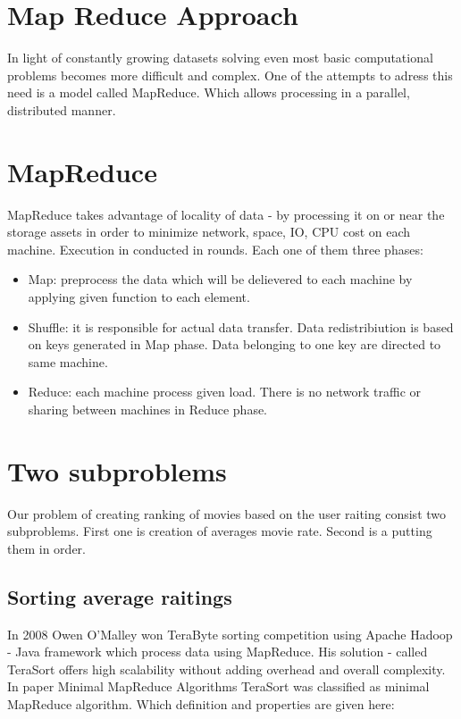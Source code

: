 \section{Map Reduce Approach}
In light of constantly growing datasets solving even 
most basic computational problems becomes more difficult and complex.
One of the attempts to adress this need is a model called MapReduce.
Which allows processing in a parallel, distributed manner.

\section{MapReduce}
MapReduce takes advantage of locality of data - by processing it on 
or near the storage assets in order to minimize network, space, IO,
CPU cost on each machine.
Execution in conducted in rounds. Each one of them three phases:

\begin{itemize}
\item Map: preprocess the data which will be delievered to each machine by applying 
given function to each element. 
\item Shuffle: it is responsible for actual data transfer. Data redistribiution is based on 
keys generated in Map phase. Data belonging to one key are directed to same machine. 
\item Reduce: each machine process given load. There is no network traffic or sharing between machines
in Reduce phase.
\end{itemize}


\section{Two subproblems}
Our problem of creating ranking of movies based on the user raiting 
consist two subproblems. First one is creation of averages movie rate.
Second is a putting them in order. 


\subsection{Sorting average raitings}
In 2008 Owen O'Malley won TeraByte sorting competition using Apache Hadoop
- Java framework which process data using MapReduce. His solution - called TeraSort offers
high scalability without adding overhead and overall complexity.
In paper Minimal MapReduce Algorithms TeraSort was classified as
minimal MapReduce algorithm. Which definition and properties are given
here:

